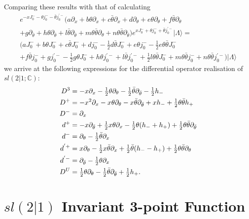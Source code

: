 \documentclass[a4paper,12pt]{article}
\def\thetabar    {\bar{\theta}}
\def\fsl         {sl(2|1;\mathbb C)}
\def\hf          {\tfrac{1}{2}}
\begin{document}
Comparing these results with that of calculating
\begin{multline}
e^{-xJ_0^- - \theta j_0^- - \thetabar j_0^{'-}} (a\partial_x + b
\theta \partial_x +c \thetabar \partial_x + d\partial_{\theta}
+e\theta \partial_{\theta} +f\thetabar \partial_{\theta}\\
+g\partial_{\thetabar} +h\theta \partial_{\thetabar} +l\thetabar
\partial_{\thetabar}+m\theta\thetabar\partial_{\theta}+n\theta\thetabar\partial_{\thetabar}) e^{xJ_0^- + \theta j_0^- + \thetabar j_0^{'-}}|\Lambda\rangle
=\\
 (a J_0^- + b\theta J_0^- +c \thetabar J_0^- + d j_0^- - \hf d
\thetabar J_0^- +e\theta j_0^- - \hf e\theta \thetabar  J_0^-\\
 + f\thetabar j_0^- + g j_0^{'-} - \hf g\theta J_0^- + h\theta
j_0^{'-} + l\thetabar j_0^{'-} +\hf l\theta \thetabar J_0^- +m\theta\thetabar j_0^- +n\theta\thetabar j_0^{'-})|\Lambda\rangle
\end{multline}
we arrive at the following expressions for the differential operator
realisation of $\fsl$:
\begin{align}
\label{diffop}
D^3 &= -x\partial_x - \hf\theta \partial_{\theta} - \hf \thetabar
\partial_{\thetabar} - \hf h_- \notag\\
D^+ &= -x^2 \partial_x - x\theta \partial_{\theta} - x\thetabar
\partial_{\thetabar} + xh_- + \hf \theta \thetabar h_+ \notag\\
D^- &= \partial_x \notag\\
d^+ &= -x \partial_{\thetabar} + \hf x\theta \partial_x - \hf \theta
(h_- + h_+) + \hf \theta \thetabar \partial_{\thetabar} \notag\\
d^- &= \partial_{\theta} - \hf \thetabar \partial_x \notag\\
d^{'+} &= x \partial_{\theta} - \hf x\thetabar \partial_x + \hf \thetabar
(h_- - h_+) + \hf \theta \thetabar \partial_{\theta} \notag\\
d^{'-} &= \partial_{\thetabar} - \hf \theta \partial_x \notag\\
D^U &= \hf \theta \partial_{\theta} - \hf \thetabar
\partial_{\thetabar} + \hf h_+.
\end{align}




\section{$sl(2|1)$ Invariant 3-point Function}
\end{document}
